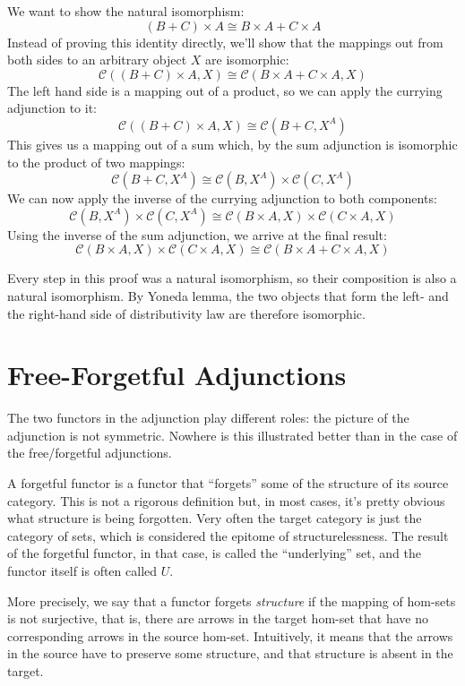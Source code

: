 \documentclass[DaoFP]{subfiles}
\begin{document}
We want to show the natural isomorphism:
\[(B + C) \times A \cong B \times A + C \times A \]
Instead of proving this identity directly, we'll show that the mappings out from both sides to an arbitrary object $X$ are isomorphic:
\[  \mathcal{C} ((B + C) \times A, X) \cong \mathcal{C}(B \times A + C \times A, X) \]
The left hand side is a mapping out of a product, so we can apply the currying adjunction to it:
\[  \mathcal{C} ((B + C) \times A, X) \cong \mathcal{C}(B + C, X^A) \]
This gives us a mapping out of a sum which, by the sum adjunction is isomorphic to the product of two mappings:
\[  \mathcal{C}(B + C, X^A) \cong \mathcal{C}(B, X^A) \times \mathcal{C}(C, X^A)\]
We can now apply the inverse of the currying adjunction to both components:
\[  \mathcal{C}(B, X^A) \times \mathcal{C}(C, X^A) \cong \mathcal{C}(B \times A, X) \times \mathcal{C}(C \times A, X)\]
Using the inverse of the sum adjunction, we arrive at the final result:
\[ \mathcal{C}(B \times A, X) \times \mathcal{C}(C \times A, X) \cong \mathcal{C}(B \times A + C \times A, X) \]

Every step in this proof was a natural isomorphism, so their composition is also a natural isomorphism. By Yoneda lemma, the two objects that form the left- and the right-hand side of distributivity law are therefore isomorphic.

\section{Free-Forgetful Adjunctions}
The two functors in the adjunction play different roles: the picture of the adjunction is not symmetric. Nowhere is this illustrated better than in the case of the free/forgetful adjunctions. 

A forgetful functor is a functor that ``forgets'' some of the structure of its source category. This is not a rigorous definition but, in most cases, it's pretty obvious what structure is being forgotten. Very often the target category is just the category of sets, which is considered the epitome of structurelessness. The result of the forgetful functor, in that case, is called the ``underlying'' set, and the functor itself is often called $U$. 

More precisely, we say that a functor forgets \emph{structure} if the mapping of hom-sets is not surjective, that is, there are arrows in the target hom-set that have no corresponding arrows in the source hom-set. Intuitively, it means that the arrows in the source have to preserve some structure, and that structure is absent in the target. 
\end{document}
